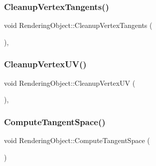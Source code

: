 \hypertarget{class_rendering_object_a0e6c8c9480f1c04202aa6d38a841f06f}{}\label{class_rendering_object_a0e6c8c9480f1c04202aa6d38a841f06f}
\subsubsection{\texorpdfstring{Cleanup\+Vertex\+Tangents()}{CleanupVertexTangents()}}
{\footnotesize\ttfamily void Rendering\+Object\+::\+Cleanup\+Vertex\+Tangents (\begin{DoxyParamCaption}{ }\end{DoxyParamCaption})\hspace{0.3cm}{\ttfamily [protected]}, {\ttfamily [virtual]}}

\hypertarget{class_rendering_object_a776f54b41f9e9f0e55fc1104919c3e7c}{}\label{class_rendering_object_a776f54b41f9e9f0e55fc1104919c3e7c}
\subsubsection{\texorpdfstring{Cleanup\+Vertex\+U\+V()}{CleanupVertexUV()}}
{\footnotesize\ttfamily void Rendering\+Object\+::\+Cleanup\+Vertex\+UV (\begin{DoxyParamCaption}{ }\end{DoxyParamCaption})\hspace{0.3cm}{\ttfamily [protected]}, {\ttfamily [virtual]}}

\hypertarget{class_rendering_object_adec25796def807fd09a5fc4f1fbd0c41}{}\label{class_rendering_object_adec25796def807fd09a5fc4f1fbd0c41}
\subsubsection{\texorpdfstring{Compute\+Tangent\+Space()}{ComputeTangentSpace()}}
{\footnotesize\ttfamily void Rendering\+Object\+::\+Compute\+Tangent\+Space (\begin{DoxyParamCaption}{ }\end{DoxyParamCaption})\hspace{0.3cm}{\ttfamily [virtual]}}

